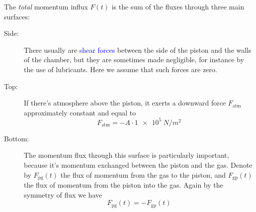\documentclass[a4paper,12pt,%
onecolumn,oneside,%
british%
]{memoir}
\renewcommand*{\|}[1][]{\nonscript\:#1\vert\nonscript\:\mathopen{}}
\newcommand*{\sect}{\S}%
\renewcommand*{\autoref}[2]{\sidepar{\vspace{-1ex}\footnotesize{\color{blue}\faIcon{%
angle-right%
}\enskip\sect~\ref{#1} page~\pageref{#1}}}\textcolor{blue}{#2}}
\newcommand*{\yFpg}{F_{\text{pg}}}
\newcommand*{\yFgp}{F_{\text{gp}}}
\newcommand*{\yFatm}{F_{\text{atm}}}
\begin{document}
The \emph{total} momentum influx $F(t)$ is the sum of the fluxes through three main surfaces:
\begin{description}
\item[Side:] There usually are \autoref{sec:shear}{shear forces} between the side of the piston and the walls of the chamber, but they are sometimes made negligible, for instance by the use of lubricants. Here we assume that such forces are zero.

\item[Top:] If there's atmosphere above the piston, it exerts a downward force $\yFatm$ approximately constant and equal to
  \begin{equation}
    \label{eq:gas_piston_Fatm}
    \yFatm = - A\cdot\qty[print-unity-mantissa=false]{1e5}{N/m^{2}}
  \end{equation}

\item[Bottom:] The momentum flux through this surface is particularly important, because it's momentum exchanged between the piston and the gas. Denote by $\yFpg(t)$ the flux of momentum from the gas to the piston, and $\yFgp(t)$ the flux of momentum from the piston into the gas. Again by the symmetry of flux we have
  \begin{equation*}
    \yFpg(t) = -\yFgp(t)
  \end{equation*}
%
%


\end{description}
\end{document}
